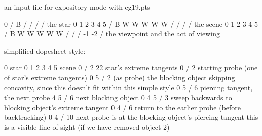 an input file for expository mode with eg19.pts

0 / B / / / /                      { the star }
0 1 2 3 4 5 / B W W W W W / / / /  { the scene }
0 1 2 3 4 5 / B W W W W W / / / -1 -2 / { the viewpoint and the act of viewing }

simplified dopesheet style:

0               star
0 1 2 3 4 5     scene
0 / 2 22        star's extreme tangents
0 / 2           starting probe (one of star's extreme tangents)
0 5 / 2 (as probe) the blocking object
skipping concavity, since this doesn't fit within this simple style
0 5 / 6         piercing tangent, the next probe
4 5 / 6         next blocking object
0 4 5 / 3       sweep backwards to blocking object's extreme tangent
0 4 / 6         return to the earlier probe (before backtracking)
0 4 / 10        next probe is at the blocking object's piercing tangent
                this is a visible line of sight (if we have removed object 2)
